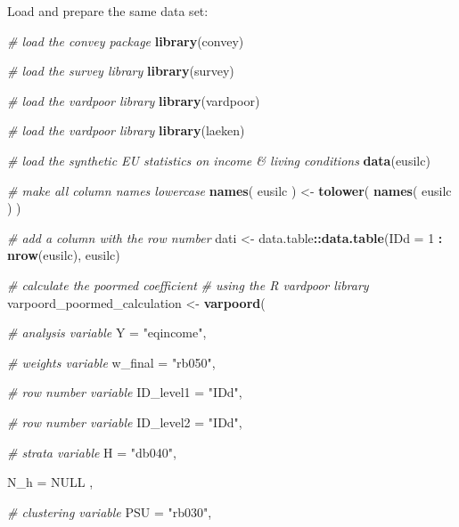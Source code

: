 \documentclass[]{book}
\newenvironment{Shaded}{\begin{snugshade}}{\end{snugshade}}
\newcommand{\CommentTok}[1]{\textcolor[rgb]{0.56,0.35,0.01}{\textit{#1}}}
\newcommand{\DataTypeTok}[1]{\textcolor[rgb]{0.13,0.29,0.53}{#1}}
\newcommand{\DecValTok}[1]{\textcolor[rgb]{0.00,0.00,0.81}{#1}}
\newcommand{\KeywordTok}[1]{\textcolor[rgb]{0.13,0.29,0.53}{\textbf{#1}}}
\newcommand{\NormalTok}[1]{#1}
\newcommand{\OperatorTok}[1]{\textcolor[rgb]{0.81,0.36,0.00}{\textbf{#1}}}
\newcommand{\OtherTok}[1]{\textcolor[rgb]{0.56,0.35,0.01}{#1}}
\newcommand{\StringTok}[1]{\textcolor[rgb]{0.31,0.60,0.02}{#1}}
\begin{document}
Load and prepare the same data set:

\begin{Shaded}
\begin{Highlighting}[]
\CommentTok{# load the convey package}
\KeywordTok{library}\NormalTok{(convey)}

\CommentTok{# load the survey library}
\KeywordTok{library}\NormalTok{(survey)}

\CommentTok{# load the vardpoor library}
\KeywordTok{library}\NormalTok{(vardpoor)}

\CommentTok{# load the vardpoor library}
\KeywordTok{library}\NormalTok{(laeken)}

\CommentTok{# load the synthetic EU statistics on income & living conditions}
\KeywordTok{data}\NormalTok{(eusilc)}

\CommentTok{# make all column names lowercase}
\KeywordTok{names}\NormalTok{( eusilc ) <-}\StringTok{ }\KeywordTok{tolower}\NormalTok{( }\KeywordTok{names}\NormalTok{( eusilc ) )}

\CommentTok{# add a column with the row number}
\NormalTok{dati <-}\StringTok{ }\NormalTok{data.table}\OperatorTok{::}\KeywordTok{data.table}\NormalTok{(}\DataTypeTok{IDd =} \DecValTok{1} \OperatorTok{:}\StringTok{ }\KeywordTok{nrow}\NormalTok{(eusilc), eusilc)}

\CommentTok{# calculate the poormed coefficient}
\CommentTok{# using the R vardpoor library}
\NormalTok{varpoord_poormed_calculation <-}
\StringTok{    }\KeywordTok{varpoord}\NormalTok{(}
    
        \CommentTok{# analysis variable}
        \DataTypeTok{Y =} \StringTok{"eqincome"}\NormalTok{, }
        
        \CommentTok{# weights variable}
        \DataTypeTok{w_final =} \StringTok{"rb050"}\NormalTok{,}
        
        \CommentTok{# row number variable}
        \DataTypeTok{ID_level1 =} \StringTok{"IDd"}\NormalTok{,}

        \CommentTok{# row number variable}
        \DataTypeTok{ID_level2 =} \StringTok{"IDd"}\NormalTok{,}
                
        \CommentTok{# strata variable}
        \DataTypeTok{H =} \StringTok{"db040"}\NormalTok{, }
        
        \DataTypeTok{N_h =} \OtherTok{NULL}\NormalTok{ ,}
        
        \CommentTok{# clustering variable}
        \DataTypeTok{PSU =} \StringTok{"rb030"}\NormalTok{, }
        

\end{Highlighting}
\end{Shaded}
\end{document}
